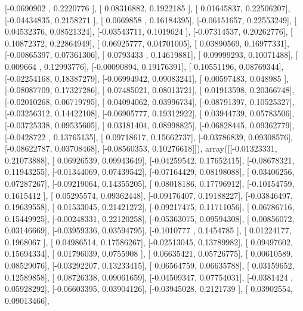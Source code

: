 \documentclass{article}
\begin{document}
       [-0.0690902 ,  0.2220776 ],
       [ 0.08316882,  0.1922185 ],
       [ 0.01645837,  0.22506207],
       [-0.04434835,  0.2158271 ],
       [ 0.0669858 ,  0.16184395],
       [-0.06151657,  0.22553249],
       [ 0.04532376,  0.08521324],
       [-0.03543711,  0.1019624 ],
       [-0.07314537,  0.20262776],
       [ 0.10872372,  0.22864949],
       [ 0.06925777,  0.04701005],
       [ 0.03890569,  0.16977331],
       [-0.00865397,  0.07361306],
       [ 0.0793433 ,  0.14619881],
       [ 0.09999293,  0.10071488],
       [ 0.009664  ,  0.12993776],
       [-0.00090894,  0.19176391],
       [ 0.10551196,  0.08769344],
       [-0.02254168,  0.18387279],
       [-0.06994942,  0.09083241],
       [ 0.00597483,  0.048985  ],
       [-0.08087709,  0.17327286],
       [ 0.07485021,  0.08013721],
       [ 0.01913598,  0.20366748],
       [-0.02010268,  0.06719795],
       [ 0.04094062,  0.03996734],
       [-0.08791397,  0.10525327],
       [-0.03256312,  0.14422108],
       [-0.06905777,  0.19312922],
       [ 0.03944739,  0.05783506],
       [-0.03725338,  0.09535605],
       [ 0.03181404,  0.08998825],
       [-0.06828445,  0.09362779],
       [-0.0428722 ,  0.13765135],
       [ 0.09718617,  0.15662737],
       [-0.03786839,  0.09308576],
       [-0.08622787,  0.03708468],
       [-0.08560353,  0.10276618]]), array([[-0.01323331,  0.21073888],
       [ 0.06926539,  0.09943649],
       [-0.04259542,  0.17652415],
       [-0.08678321,  0.11943255],
       [-0.01344069,  0.07439542],
       [-0.07164429,  0.08198088],
       [ 0.03406256,  0.07287267],
       [-0.09219064,  0.14355205],
       [ 0.08018186,  0.17796912],
       [-0.10154759,  0.1615412 ],
       [ 0.05295574,  0.09362448],
       [-0.09176407,  0.19188227],
       [-0.03846497,  0.19639558],
       [ 0.01533045,  0.21421272],
       [-0.09217475,  0.11711056],
       [ 0.06786716,  0.15449925],
       [-0.00248331,  0.22120258],
       [-0.05363075,  0.09594308],
       [ 0.00856072,  0.03146669],
       [-0.03959336,  0.03594795],
       [-0.1010777 ,  0.1454785 ],
       [ 0.01224177,  0.1968067 ],
       [ 0.04986514,  0.17586267],
       [-0.02513045,  0.13789982],
       [ 0.09497602,  0.15694334],
       [ 0.01796039,  0.0755908 ],
       [ 0.06635421,  0.05726775],
       [ 0.00610589,  0.08529076],
       [-0.03292207,  0.13233415],
       [ 0.06564759,  0.06635788],
       [ 0.03159652,  0.12589858],
       [ 0.08726338,  0.09061659],
       [-0.04509347,  0.07754031],
       [-0.0381424 ,  0.05928292],
       [-0.06603395,  0.03904126],
       [-0.03945028,  0.2121739 ],
       [ 0.03902554,  0.09013466],
\end{document}
